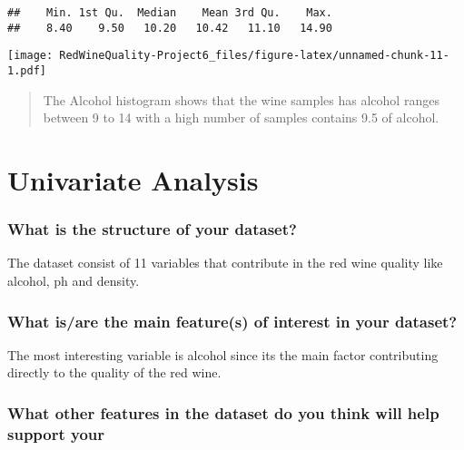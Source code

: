 \documentclass[]{article}
\begin{document}
\begin{verbatim}
##    Min. 1st Qu.  Median    Mean 3rd Qu.    Max. 
##    8.40    9.50   10.20   10.42   11.10   14.90
\end{verbatim}

\texttt{[image: RedWineQuality-Project6\_files/figure-latex/unnamed-chunk-11-1.pdf]}

\begin{quote}
The Alcohol histogram shows that the wine samples has alcohol ranges
between 9 to 14 with a high number of samples contains 9.5 of alcohol.
\end{quote}

\hypertarget{univariate-analysis}{%
\section{Univariate Analysis}\label{univariate-analysis}}

\hypertarget{what-is-the-structure-of-your-dataset}{%
\subsubsection{What is the structure of your
dataset?}\label{what-is-the-structure-of-your-dataset}}

The dataset consist of 11 variables that contribute in the red wine
quality like alcohol, ph and density.

\hypertarget{what-isare-the-main-features-of-interest-in-your-dataset}{%
\subsubsection{What is/are the main feature(s) of interest in your
dataset?}\label{what-isare-the-main-features-of-interest-in-your-dataset}}

The most interesting variable is alcohol since its the main factor
contributing directly to the quality of the red wine.

\hypertarget{what-other-features-in-the-dataset-do-you-think-will-help-support-your}{%
\subsubsection{\texorpdfstring{What other features in the dataset do you
think will help support your\\
}{What other features in the dataset do you think will help support your }}\label{what-other-features-in-the-dataset-do-you-think-will-help-support-your}}
\end{document}
